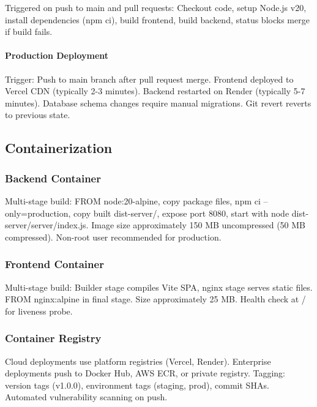 \documentclass[12pt,oneside,openright,a4paper]{cpe-english-project}
\begin{document}
Triggered on push to main and pull requests: Checkout code, setup Node.js v20, install dependencies (npm ci), build frontend, build backend, status blocks merge if build fails.

\paragraph{Production Deployment}

Trigger: Push to main branch after pull request merge. Frontend deployed to Vercel CDN (typically 2-3 minutes). Backend restarted on Render (typically 5-7 minutes). Database schema changes require manual migrations. Git revert reverts to previous state.

\vspace{1em}

\subsection{Containerization}

\subsubsection{Backend Container}

Multi-stage build: FROM node:20-alpine, copy package files, npm ci --only=production, copy built dist-server/, expose port 8080, start with node dist-server/server/index.js. Image size approximately 150 MB uncompressed (50 MB compressed). Non-root user recommended for production.

\subsubsection{Frontend Container}

Multi-stage build: Builder stage compiles Vite SPA, nginx stage serves static files. FROM nginx:alpine in final stage. Size approximately 25 MB. Health check at / for liveness probe.

\subsubsection{Container Registry}

Cloud deployments use platform registries (Vercel, Render). Enterprise deployments push to Docker Hub, AWS ECR, or private registry. Tagging: version tags (v1.0.0), environment tags (staging, prod), commit SHAs. Automated vulnerability scanning on push.
\end{document}
